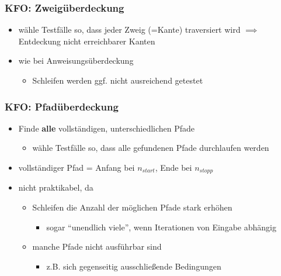 \documentclass[18pt]{beamer}
\begin{document}
	\begin{frame}
		\frametitle{KFO: Zweigüberdeckung}
		\begin{itemize}
			\item wähle Testfälle so, dass jeder Zweig (=Kante) traversiert wird \pause
			\linebreak $\implies$ Entdeckung nicht erreichbarer Kanten \pause
			\item wie bei Anweisungsüberdeckung
			\begin{itemize}
				\item Schleifen werden ggf. nicht ausreichend getestet
			\end{itemize}
		\end{itemize}
	\end{frame}

	\begin{frame}
		\frametitle{KFO: Pfadüberdeckung}
		\begin{itemize}
			\item Finde \textbf{alle} vollständigen, unterschiedlichen Pfade 
			\begin{itemize}
				\item wähle Testfälle so, dass alle gefundenen Pfade durchlaufen werden
			\end{itemize}
			\item vollständiger Pfad = Anfang bei $n_{start}$, Ende bei $n_{stopp}$ \pause
			\item nicht praktikabel, da 
			\begin{itemize}
				\item Schleifen die Anzahl der möglichen Pfade stark erhöhen 
				\begin{itemize}
					\item sogar \enquote{unendlich viele}, wenn Iterationen von Eingabe abhängig\pause
				\end{itemize}
				\item manche Pfade nicht ausführbar sind
				\begin{itemize}
					\item z.B. sich gegenseitig ausschließende Bedingungen
				\end{itemize} 
			\end{itemize}
		\end{itemize}
	\end{frame}
\end{document}
